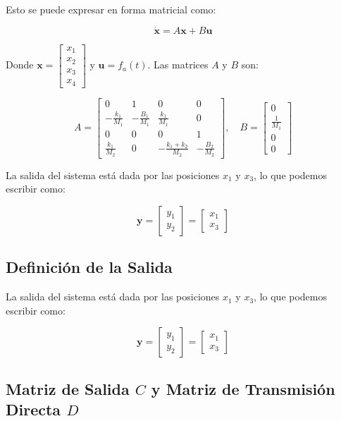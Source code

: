 \documentclass{report}
\begin{document}
Esto se puede expresar en forma matricial como:

\[
\dot{\mathbf{x}} = A\mathbf{x} + B\mathbf{u}
\]

Donde \(\mathbf{x} = \begin{bmatrix} x_1 \\ x_2 \\ x_3 \\ x_4 \end{bmatrix}\) y \(\mathbf{u} = f_a(t)\). Las matrices \(A\) y \(B\) son:

\[
A = \begin{bmatrix}
0 & 1 & 0 & 0 \\
-\frac{k_1}{M_1} & -\frac{B_1}{M_1} & \frac{k_1}{M_1} & 0 \\
0 & 0 & 0 & 1 \\
\frac{k_1}{M_2} & 0 & -\frac{k_1 + k_2}{M_2} & -\frac{B_2}{M_2}
\end{bmatrix}, \quad B = \begin{bmatrix}
0 \\
\frac{1}{M_1} \\
0 \\
0
\end{bmatrix}
\]

La salida del sistema está dada por las posiciones \(x_1\) y \(x_3\), lo que podemos escribir como:

\[
\mathbf{y} = \begin{bmatrix} y_1 \\ y_2 \end{bmatrix} = \begin{bmatrix} x_1 \\ x_3 \end{bmatrix}
\]

\subsection{Definición de la Salida}

La salida del sistema está dada por las posiciones \(x_1\) y \(x_3\), lo que podemos escribir como:

\[
\mathbf{y} = \begin{bmatrix} y_1 \\ y_2 \end{bmatrix} = \begin{bmatrix} x_1 \\ x_3 \end{bmatrix}
\]

\subsection{Matriz de Salida \(C\) y Matriz de Transmisión Directa \(D\)}
\end{document}
